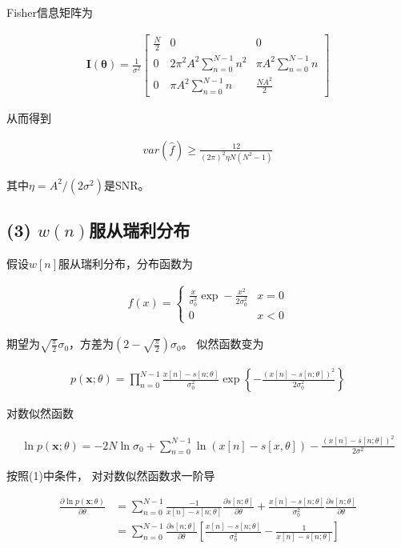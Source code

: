 \documentclass[fontset=windows]{article}
\numberwithin{figure}{section}
\begin{document}
Fisher信息矩阵为

\begin{align*}
    \mathbf{I}(\boldsymbol{\theta})=\frac{1}{\sigma^2}
    \begin{bmatrix}
        \frac{N}{2} & 0                             & 0                        \\
        0           & 2\pi^2 A^2\sum_{n=0}^{N-1}n^2 & \pi A^2\sum_{n=0}^{N-1}n \\
        0           & \pi A^2\sum_{n=0}^{N-1}n      & \frac{NA^2}{2}
    \end{bmatrix}
\end{align*}

从而得到

\begin{align*}
    var(\hat{f}) \geq \frac{12}{(2\pi)^2\eta N (N^2-1)}
\end{align*}

其中\(\eta=A^2/(2\sigma^2)\)是SNR。
\subsection*{(3) \(w(n)\)服从瑞利分布}
假设\(w[n]\)服从瑞利分布，分布函数为

\begin{align*}
    f(x)=\left\{
    \begin{matrix}
        \frac{x}{\sigma_0^2} \exp -\frac{x^2}{2\sigma_0 ^2} & x = 0 \\
        0                                                   & x<0
    \end{matrix}
    \right.
\end{align*}

期望为\(\sqrt{\frac{\pi}{2}}\sigma_0\)，方差为\((2-\sqrt{\frac{\pi}{2}})\sigma_0\)。
似然函数变为

\begin{align*}
    p(\mathbf{x};\theta)=\prod_{n=0}^{N-1}\frac{x[n]-s[n;\theta]}{\sigma_0^2}
    \exp \left\{ -\frac{(x[n]-s[n;\theta])^2}{2\sigma_0^2}\right\}
\end{align*}

对数似然函数

\begin{align*}
    \ln p(\mathbf{x};\theta)=-2N\ln \sigma_0+\sum_{n=0}^{N-1}\ln (x[n]-s[x,\theta])
    -\frac{(x[n]-s[n;\theta])^2}{2\sigma^2}
\end{align*}

按照(1)中条件，
对对数似然函数求一阶导

\begin{align*}
    \frac{\partial \ln p(\mathbf{x};\theta)}{\partial \theta}
     & =\sum_{n=0}^{N-1}\frac{-1}{x[n]-s[n;\theta]}\frac{\partial s[n;\theta]}{\partial \theta}
    +\frac{x[n]-s[n;\theta]}{\sigma_0^2}\frac{\partial s[n;\theta]}{\partial \theta}            \\
     & =\sum_{n=0}^{N-1}\frac{\partial s[n;\theta]}{\partial \theta}
    \left[\frac{x[n]-s[n;\theta]}{\sigma_0^2}-\frac{1}{x[n]-s[n;\theta]}\right]
\end{align*}
\end{document}

